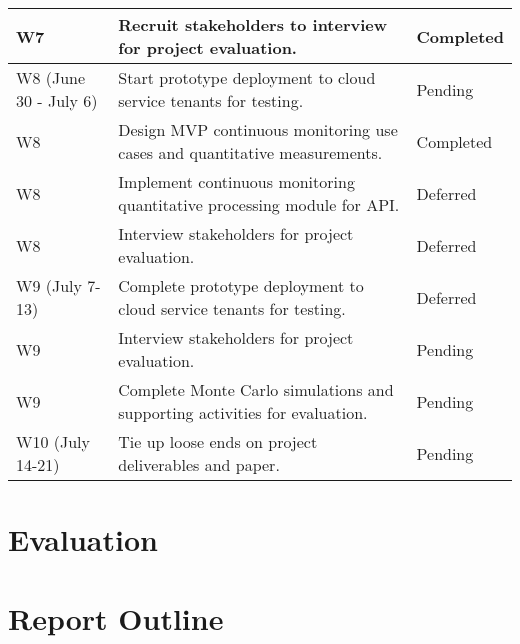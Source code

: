 \documentclass{jdf}
\begin{document}
\begin{xltabular}{\textwidth}{|l|X|l|}
    \hline
    W7 & Recruit stakeholders to interview for project evaluation. & Completed \\
    \hline          
    W8 (June 30 - July 6) & Start prototype deployment to cloud service tenants for testing. & Pending \\
    \hline
    W8 & Design MVP continuous monitoring use cases and quantitative measurements. & Completed \\
    \hline
    W8 & Implement continuous monitoring quantitative processing module for API. & Deferred \\
    \hline    
    W8 & Interview stakeholders for project evaluation. & Deferred \\
    \hline  
    W9 (July 7-13) & Complete prototype deployment to cloud service tenants for testing. & Deferred \\
    \hline
    W9 & Interview stakeholders for project evaluation. & Pending \\
    \hline
    W9 & Complete Monte Carlo simulations and supporting activities for evaluation. & Pending \\
    W10 (July 14-21) & Tie up loose ends on project deliverables and paper. & Pending \\    
    \hline    
\end{xltabular}

\section*{Evaluation}



\section*{Report Outline}



\nocite{*}



\section*{}


\end{document}
